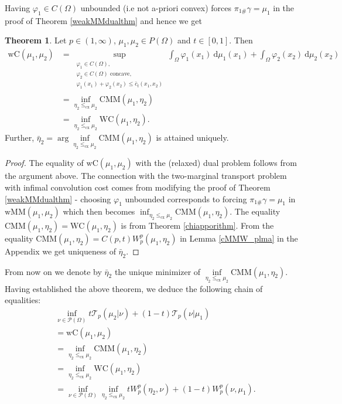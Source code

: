 \documentclass[letterpaper]{amsart}
\newcommand{\dd}{\mathrm{d}}
\theoremstyle{definition}
\newtheorem{thm}{Theorem}[section]
\begin{document}
Having $\varphi_1\in C(\Omega)$ unbounded (i.e not a-priori convex) forces $\pi_{1\#}\gamma=\mu_1$ in the proof of Theorem \ref{weakMMdualthm} and hence we get
\begin{thm}\label{weakdualityN2thm}
	Let $p\in(1,\infty)$, $\mu_1,\mu_2\in P(\Omega)$ and $t\in[0,1]$. Then
	\begin{align*}
		\text{wC}(\mu_1,\mu_2)&=\sup_{\substack{\varphi_1\in C(\Omega),\\ \varphi_2\in C(\Omega)\text{ concave},\\
				\varphi_1(x_1)+\varphi_2(x_2)\leq\bar c_t(x_1,x_2)}}\int_\Omega\varphi_1(x_1)\ \dd\mu_1(x_1)+\int_\Omega\varphi_2(x_2)\ \dd\mu_2(x_2)\\
		&=\inf_{\eta_2\leq_{\text{cx}}\mu_2}\text{CMM}(\mu_1,\eta_2)\\
		&=\inf_{\eta_2\leq_{\text{cx}}\mu_2}\text{WC}(\mu_1,\eta_2).
	\end{align*}
	Further, $\bar\eta_2=\arg\inf\limits_{\eta_2\leq_{\text{cx}}\mu_2}\text{CMM}(\mu_1,\eta_2)$ is attained uniquely.
\end{thm}
\begin{proof}
	The equality of $\text{wC}(\mu_1,\mu_2)$ with the (relaxed) dual problem follows from the argument above. The connection with the two-marginal transport problem with infimal convolution cost comes from modifying the proof of Theorem \ref{weakMMdualthm} - choosing $\varphi_1$ unbounded corresponds to forcing $\pi_{1\#}\gamma=\mu_1$ in $\text{wMM}(\mu_1,\mu_2)$ which then becomes $\inf_{\eta_2\leq_{\text{cx}}\mu_2}\text{CMM}(\mu_1,\eta_2)$. The equality $\text{CMM}(\mu_1,\eta_2)=\text{WC}(\mu_1,\eta_2)$ is from Theorem \ref{chiapporithm}. From the equality $\text{CMM}(\mu_1,\eta_2)=C(p,t)W_p^p(\mu_1,\eta_2)$ in Lemma \ref{cMMW_plma} in the Appendix we get uniqueness of $\bar\eta_2$.
\end{proof}
From now on we denote by $\bar\eta_2$ the unique minimizer of $\inf\limits_{\eta_2\leq_{\text{cx}}\mu_2}\text{CMM}(\mu_1,\eta_2)$.
Having established the above theorem, we deduce the following chain of equalities:
\begin{align*}
	&\inf_{\nu\in\mathcal P(\Omega)}t\mathcal T_p(\mu_2|\nu)+(1-t)\mathcal T_p(\nu|\mu_1)\\
	&=\text{wC}(\mu_1,\mu_2)\\
	&=\inf_{\eta_2\leq_{\text{cx}}\mu_2}\text{CMM}(\mu_1,\eta_2)\\
	&=\inf_{\eta_2\leq_{\text{cx}}\mu_2}\text{WC}(\mu_1,\eta_2)\\
	&=\inf_{\nu\in\mathcal P(\Omega)}\inf_{\eta_2\leq_{\text{cx}}\mu_2}tW_p^p(\eta_2,\nu)+(1-t)W_p^p(\nu,\mu_1).
\end{align*}
\end{document}
